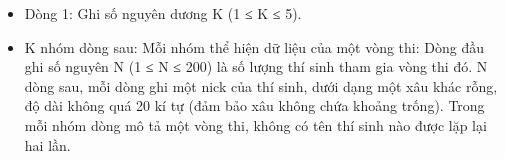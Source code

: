 \begin{itemize}
	\item Dòng 1: Ghi số nguyên dương K (1 ≤ K ≤ 5).
	\item K nhóm dòng sau: Mỗi nhóm thể hiện dữ liệu của một vòng thi: Dòng đầu ghi số nguyên N (1 ≤ N ≤ 200) là số lượng thí sinh tham gia vòng thi đó. N dòng sau, mỗi dòng ghi một nick của thí sinh, dưới dạng một xâu khác rỗng, độ dài không quá 20 kí tự (đảm bảo xâu không chứa khoảng trống). Trong mỗi nhóm dòng mô tả một vòng thi, không có tên thí sinh nào được lặp lại hai lần.
\end{itemize}
